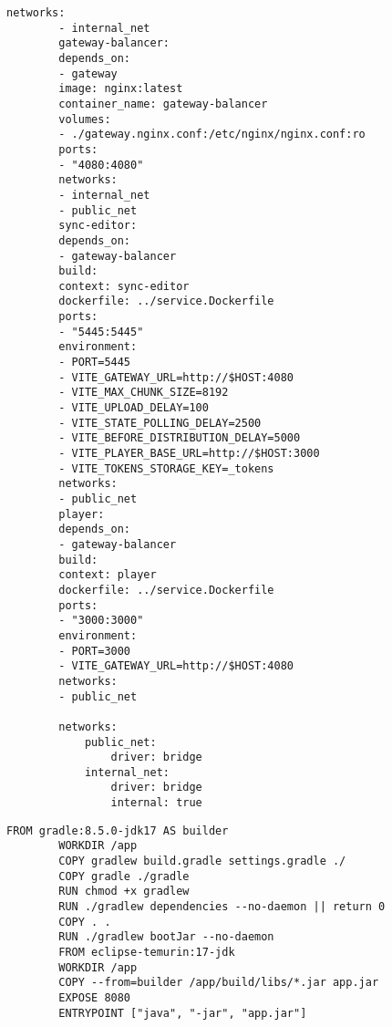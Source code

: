 \begin{lstlisting}[caption={Конфигурация Docker Compose}]
		networks:
		- internal_net
		gateway-balancer:
		depends_on:
		- gateway
		image: nginx:latest
		container_name: gateway-balancer
		volumes:
		- ./gateway.nginx.conf:/etc/nginx/nginx.conf:ro
		ports:
		- "4080:4080"
		networks:
		- internal_net
		- public_net
		sync-editor:
		depends_on:
		- gateway-balancer
		build:
		context: sync-editor
		dockerfile: ../service.Dockerfile
		ports:
		- "5445:5445"
		environment:
		- PORT=5445
		- VITE_GATEWAY_URL=http://$HOST:4080
		- VITE_MAX_CHUNK_SIZE=8192
		- VITE_UPLOAD_DELAY=100
		- VITE_STATE_POLLING_DELAY=2500
		- VITE_BEFORE_DISTRIBUTION_DELAY=5000
		- VITE_PLAYER_BASE_URL=http://$HOST:3000
		- VITE_TOKENS_STORAGE_KEY=_tokens
		networks:
		- public_net
		player:
		depends_on:
		- gateway-balancer
		build:
		context: player
		dockerfile: ../service.Dockerfile
		ports:
		- "3000:3000"
		environment:
		- PORT=3000
		- VITE_GATEWAY_URL=http://$HOST:4080
		networks:
		- public_net
		
		networks:
			public_net:
				driver: bridge
			internal_net:
				driver: bridge
				internal: true
	\end{lstlisting}

	\begin{lstlisting}[caption={Конфигурация Docker-образа сервиса-загрузчика}]
		FROM gradle:8.5.0-jdk17 AS builder
		WORKDIR /app
		COPY gradlew build.gradle settings.gradle ./
		COPY gradle ./gradle
		RUN chmod +x gradlew
		RUN ./gradlew dependencies --no-daemon || return 0
		COPY . .
		RUN ./gradlew bootJar --no-daemon
		FROM eclipse-temurin:17-jdk
		WORKDIR /app
		COPY --from=builder /app/build/libs/*.jar app.jar
		EXPOSE 8080
		ENTRYPOINT ["java", "-jar", "app.jar"]
	\end{lstlisting}

